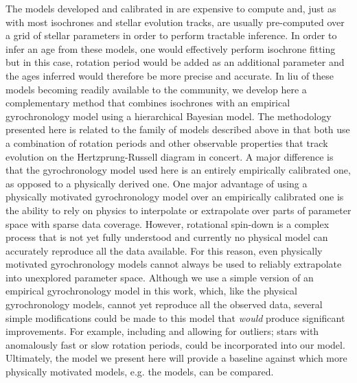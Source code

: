 The models developed and calibrated in \citet{epstein2014, vansaders2015,
vansaders2016, vansaders2018} are expensive to compute and, just as with most
isochrones and stellar evolution tracks, are usually pre-computed over a grid
of stellar parameters in order to perform tractable inference.
In order to infer an age from these models, one would effectively perform
isochrone fitting but in this case, rotation period would be added as an
additional parameter and the ages inferred would therefore be more precise and
accurate.
In liu of these models becoming readily available to the community, we develop
here a complementary method that combines isochrones with an empirical
gyrochronology model using a hierarchical Bayesian model.
The methodology presented here is related to the family of models described
above in that both use a combination of rotation periods and other observable
properties that track evolution on the Hertzprung-Russell diagram in concert.
A major difference is that the gyrochronology model used here is an entirely
empirically calibrated one, as opposed to a physically derived one.
One major advantage of using a physically motivated gyrochronology model over
an empirically calibrated one is the ability to rely on physics to interpolate
or extrapolate over parts of parameter space with sparse data coverage.
However, rotational spin-down is a complex process that is not yet fully
understood and currently no physical model can accurately reproduce all the
data available.
For this reason, even physically motivated gyrochronology models cannot always
be used to reliably extrapolate into unexplored parameter space.
Although we use a simple version of an empirical gyrochronology model in this
work, which, like the physical gyrochronology models, cannot yet reproduce all
the observed data, several simple modifications could be made to this model
that {\it would} produce significant improvements.
For example, including and allowing for outliers; stars with anomalously fast
or slow rotation periods, could be incorporated into our model.
Ultimately, the model we present here will provide a baseline against which
more physically motivated models, e.g. the \citet{vansaders2016} models, can
be compared.

